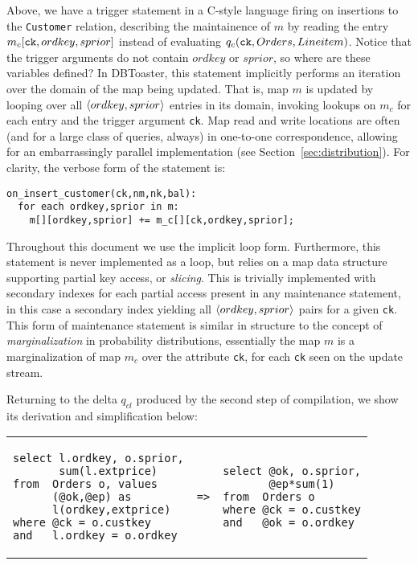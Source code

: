 Above, we have a trigger statement in a C-style language firing on insertions to
the {\tt Customer} relation, describing the maintainence of $m$ by reading the
entry $m_c[\mbox{{\tt ck}},ordkey,sprior]$ instead of evaluating $q_c(\mbox{{\tt
ck}}, Orders, Lineitem)$. Notice that the trigger arguments do not contain
$ordkey$ or $sprior$, so where are these variables defined? In DBToaster, this
statement implicitly performs an iteration over the domain of the map being
updated. That is, map $m$ is updated by looping over all ${\langle ordkey,sprior\rangle}$
entries in its domain, invoking lookups on $m_c$ for each entry and the trigger
argument {\tt ck}. Map read and write locations are often (and for a large class
of queries, always) in one-to-one correspondence, allowing for an embarrassingly
parallel implementation (see Section~\ref{sec:distribution}). For clarity, the
verbose form of the statement is:

\begin{verbatim}
on_insert_customer(ck,nm,nk,bal):
  for each ordkey,sprior in m:
    m[][ordkey,sprior] += m_c[][ck,ordkey,sprior];
\end{verbatim}

\noindent Throughout this document we use the implicit loop form.
Furthermore, this statement is never implemented as a loop, but relies on a map
data structure supporting partial key access, or \textit{slicing}. This is
trivially implemented with secondary indexes for each partial access present in
any maintenance statement, in this case a secondary index yielding all
${\langle ordkey,sprior\rangle}$ pairs for a given \texttt{ck}.
This form of maintenance statement is similar in structure to the concept of
\textit{marginalization} in probability distributions, essentially the map $m$
is a marginalization of map $m_c$ over the attribute \texttt{ck}, for each
\texttt{ck} seen on the update stream.

Returning to the delta $q_{cl}$ produced by the second step of compilation, we
show its derivation and simplification below: 

\vspace{1mm}
\hspace{-5mm}
\begin{tabular}{lcl}
\begin{minipage}{1.5in}
\begin{verbatim}
select l.ordkey, o.sprior,
       sum(l.extprice)
from  Orders o, values
      (@ok,@ep) as
      l(ordkey,extprice)
where @ck = o.custkey
and   l.ordkey = o.ordkey
\end{verbatim}
\end{minipage}
&
{\tt =>}
&
\hspace{-2mm}
\begin{minipage}{1.3in}
\begin{verbatim}
select @ok, o.sprior,
       @ep*sum(1)
from  Orders o
where @ck = o.custkey
and   @ok = o.ordkey
\end{verbatim}
\end{minipage}
\end{tabular}

